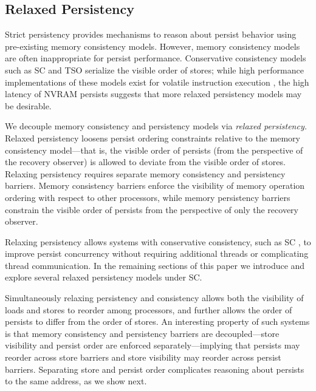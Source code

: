 \subsection{Relaxed Persistency}

Strict persistency provides mechanisms to reason about persist behavior using pre-existing memory consistency models.
However, memory consistency models are often inappropriate for persist performance.
Conservative consistency models such as SC and TSO serialize the visible order of stores; while high performance implementations of these models exist for volatile instruction execution \cite{Singh12,Lin12}, the high latency of NVRAM persists suggests that more relaxed persistency models may be desirable.

We decouple memory consistency and persistency models via \emph{relaxed persistency.}
Relaxed persistency loosens persist ordering constraints relative to the memory consistency model---that is, the visible order of persists (from the perspective of the recovery observer) is allowed to deviate from the visible order of stores.
Relaxing persistency requires separate memory consistency and persistency barriers.
Memory consistency barriers enforce the visibility of memory operation ordering with respect to other processors, while memory persistency barriers constrain the visible order of persists from the perspective of only the recovery observer.

Relaxing persistency allows systems with conservative consistency, such as SC , to improve persist concurrency without requiring additional threads or complicating thread communication.
In the remaining sections of this paper we introduce and explore several relaxed persistency models under SC.

Simultaneously relaxing persistency and consistency allows both the visibility of loads and stores to reorder among processors, and further allows the order of persists to differ from the order of stores.
An interesting property of such systems is that memory consistency and persistency barriers are decoupled---store visibility and persist order are enforced separately---implying that persists may reorder across store barriers and store visibility may reorder across persist barriers.
Separating store and persist order complicates reasoning about persists to the same address, as we show next.

